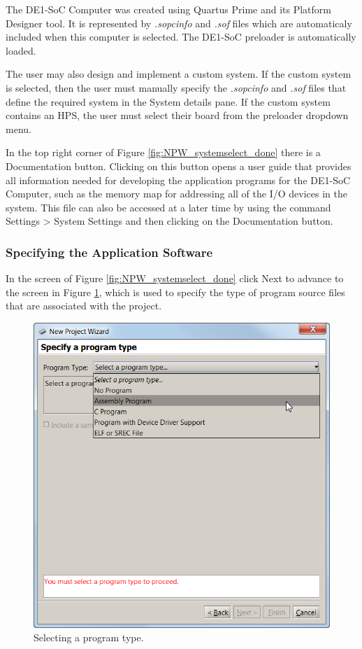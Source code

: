 \documentclass[11pt, twoside, pdftex]{article}
\begin{document}
The DE1-SoC Computer was created using Quartus Prime and its Platform Designer
tool. It is represented by \emph{.sopcinfo} and \emph{.sof} files
which are automaticaly included when this computer is selected.
The DE1-SoC preloader is automatically loaded.

The user may also design and implement a custom system.
If the custom system is selected, then the user must manually 
specify the \emph{.sopcinfo} and \emph{.sof} files that define
the required system in the {\sf System details} pane. If the custom system contains an HPS, the user must select their board from the preloader dropdown menu.

In the top right corner of Figure \ref{fig:NPW_systemselect_done} there is a 
{\sf Documentation} button. 
Clicking on this button opens a user guide that provides all
information needed for developing the application programs for
the DE1-SoC Computer, such as the memory map for addressing all
of the I/O devices in the system. This file can also be accessed
at a later time by using the command 
{\sf Settings > System Settings} and then
clicking on the {\sf Documentation} button.

\subsubsection{Specifying the Application Software}

In the screen of Figure \ref{fig:NPW_systemselect_done} click {\sf Next} to advance to the
screen in Figure \ref{fig:NPW_programtype}, which is used to specify the type of program
source files that are associated with the project.

\begin{figure}[H]
   \begin{center}
      \includegraphics[scale=1]{screenshots/figure8.png}
   \end{center}
   \caption{Selecting a program type.} 
   \label{fig:NPW_programtype}
\end{figure}
\end{document}
